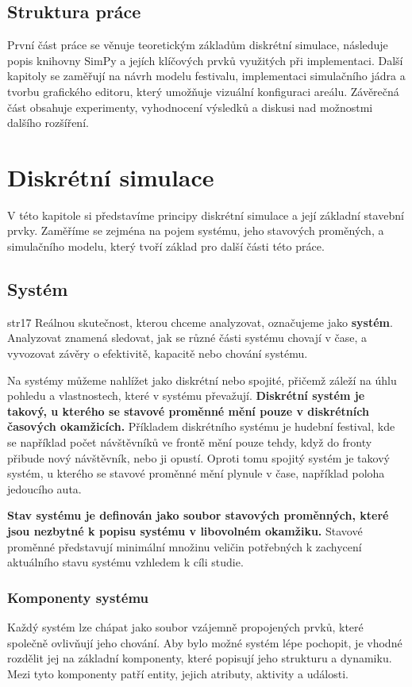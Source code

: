 \documentclass[
  program=itp,
  biblatex,
  figures=false,
  glossaries,
  index
]{kidiplom}
\begin{document}
\subsection{Struktura práce}
První část práce se věnuje teoretickým základům diskrétní simulace, následuje popis knihovny SimPy a jejích klíčových prvků využitých při implementaci. Další kapitoly se zaměřují na návrh modelu festivalu, implementaci simulačního jádra a tvorbu grafického editoru, který umožňuje vizuální konfiguraci areálu. Závěrečná část obsahuje experimenty, vyhodnocení výsledků a diskusi nad možnostmi dalšího rozšíření.


\section{Diskrétní simulace}
V této kapitole si představíme principy diskrétní simulace a její základní stavební prvky. Zaměříme se zejména na pojem systému, jeho stavových proměných, a simulačního modelu, který tvoří základ pro další části této práce.

\subsection{Systém} str17
Reálnou skutečnost, kterou chceme analyzovat, označujeme jako {\bf systém}. Analyzovat znamená sledovat, jak se různé části systému chovají v čase, a vyvozovat závěry o efektivitě, kapacitě nebo chování systému.

Na systémy můžeme nahlížet jako diskrétní nebo spojité, přičemž záleží na úhlu pohledu a vlastnostech, které v systému převažují. {\bf Diskrétní systém je takový, u kterého se stavové proměnné mění pouze v diskrétních časových okamžicích.} Příkladem diskrétního systému je hudební festival, kde se například počet návštěvníků ve frontě mění pouze tehdy, když do fronty přibude nový návštěvník, nebo ji opustí.  Oproti tomu spojitý systém je takový systém, u kterého se stavové proměnné mění plynule v čase, například poloha jedoucího auta. 

 {\bf Stav systému je definován jako soubor stavových proměnných, které jsou nezbytné k popisu systému v libovolném okamžiku.} Stavové proměnné představují minimální množinu veličin potřebných k zachycení aktuálního stavu systému vzhledem k cíli studie.


\subsubsection{Komponenty systému}
Každý systém lze chápat jako soubor vzájemně propojených prvků, které společně ovlivňují jeho chování. Aby bylo možné systém lépe pochopit, je vhodné rozdělit jej na základní komponenty, které popisují jeho strukturu a dynamiku. Mezi tyto komponenty patří entity, jejich atributy, aktivity a události.
\end{document}
